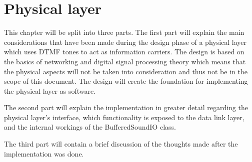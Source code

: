 \chapter{Physical layer}\label{chap:physical}
This chapter will be split into three parts. The first part will explain the main considerations that have been made during the design phase of a physical layer which uses DTMF tones to act as information carriers. The design is based on the basics of networking and digital signal processing theory which means that the physical aspects will not be taken into consideration and thus not be in the scope of this document. The design will create the foundation for implementing the physical layer as software.

The second part will explain the implementation in greater detail regarding the physical layer's interface, which functionality is exposed to the data link layer, and the internal workings of the BufferedSoundIO class.

The third part will contain a brief discussion of the thoughts made after the implementation was done.

